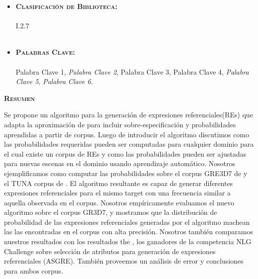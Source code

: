 \thispagestyle{empty}

\begin{itemize}
	\item \textbf{\textsc{Clasificaci\'on de Biblioteca:}} \\ \\ I.2.7 \\ \\

	\item \textbf{\textsc{Palabras Clave:}} \\ \\
	Palabra Clave 1, \emph{Palabra Clave 2}, Palabra Clave 3,
	Palabra Clave 4, \emph{Palabra Clave 5}, \emph{Palabra Clave 6}.
\end{itemize}

\begin{center}

{ \vspace*{1cm} }
\huge{\textbf{\textsc{\textmd{Resumen}}}}\\[1cm]

\end{center}

\normalsize{
Se propone un algoritmo para la generaci\'on de expresiones referenciales(REs) que adapta la aproximaci\'on de \cite{arec2:2008:Areces,arec:usin11}  para incluir sobre-especificaci\'on y probabilidades aprendidas a partir de corpus. Luego de introducir el algoritmo discutimos como las probabilidades requeridas pueden ser computadas para cualquier dominio para el cual existe un corpus de REs y como las probabilidades pueden ser ajustadas para nuevas escenas en el dominio usando aprendizaje autom\'atico. Nosotros ejemplificamos como computar las probabilidades sobre el corpus GRE3D7 de \cite{viet:gene11} y el TUNA corpus de \cite{gatt-balz-kow:2008:ENLG}. El algoritmo resultante es capaz de generar diferentes expresiones referenciales para el mismo target con una frecuencia similar a aquella observada en el corpus. Nosotros emp\'{i}ricamente evaluamos el nuevo algoritmo sobre el corpus GR3D7, y mostramos que la distribuci\'on de probabilidad de las expresiones referenciales generadas por el algoritmo machean las las encontradas en el corpus con alta precisi\'on. Nosotros tambi\'en comparamos nuestros resultados con los resultados the \cite{graph08}, los ganadores de la competencia NLG Challenge sobre selecci\'on de atributos para generaci\'on de expresiones referenciales (ASGRE). Tambi\'en proveemos un an\'alisis de error y conclusiones para ambos corpus.
}

